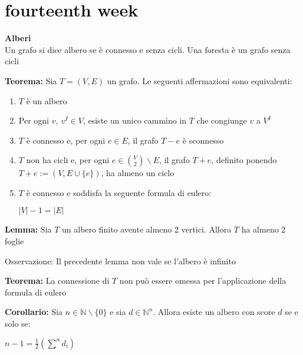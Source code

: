 \documentclass[11pt, letterpaper]{article}
\begin{document}
\newpage
\section{fourteenth week}
\textbf{Alberi}\\Un grafo si dice albero se è connesso e senza cicli. Una foresta è un grafo senza cicli

\textbf{Teorema:} Sia $T=(V,E)$ un grafo. Le seguenti affermazioni sono equivalenti:
\begin{enumerate}
    \item $T$ è un albero
    \item Per ogni $v,\ v^{I}\in V$, esiste un unico cammino in $T$ che congiunge $v$ a $V^{I}$
    \item $T$ è connesso e, per ogni $e\in E$, il grafo $T-e$ è sconnesso
    \item $T$ non ha cicli e, per ogni $e\in\binom{V}{2}\backslash E$, il grafo $T+e$, definito ponendo $T+e:=(V,
    E\cup\{e\})$, ha almeno un ciclo
    \item $T$ è connesso e soddisfa la seguente formula di eulero:
    \begin{center}
        $|V|-1=|E|$
    \end{center}
\end{enumerate} 

\textbf{Lemma:} Sia $T$ un albero finito avente almeno 2 vertici. Allora $T$ ha almeno 2 foglie

Osservazione: Il precedente lemma non vale se l'albero è infinito

\textbf{Teorema:} La connessione di $T$ non può essere omessa per l'applicazione della formula di eulero

\textbf{Corollario:} Sia $n\in\mathbb{N}\backslash\{0\}$ e sia $d\in\mathbb{N}^{n}$. Allora esiste un albero con 
score $d$ se e solo se:
\begin{center}
    $n-1=\frac{1}{2}(\sum^{n}d_{i})$
\end{center}
\end{document}
